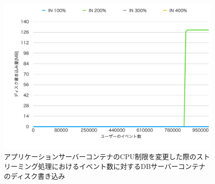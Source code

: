 \documentclass[../../../../../main]{subfiles}
\begin{document}
    \begin{figure}[H]
        \centering
        \includegraphics[width=12cm]{graph}
        \caption{アプリケーションサーバーコンテナのCPU制限を変更した際のストリーミング処理におけるイベント数に対するDBサーバーコンテナのディスク書き込み}
        \label{fig:stream-change-cpu-limit-db-disk-in-app_1024-db_1_1024}
    \end{figure}
\end{document}
